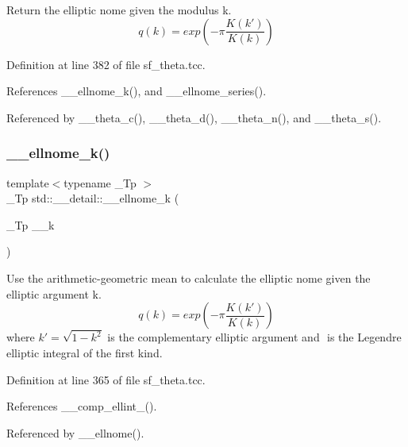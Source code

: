 Return the elliptic nome given the modulus {\ttfamily k}. \[ q(k) = exp\left(-\pi\frac{K(k')}{K(k)}\right) \] 

Definition at line 382 of file sf\+\_\+theta.\+tcc.



References \+\_\+\+\_\+ellnome\+\_\+k(), and \+\_\+\+\_\+ellnome\+\_\+series().



Referenced by \+\_\+\+\_\+theta\+\_\+c(), \+\_\+\+\_\+theta\+\_\+d(), \+\_\+\+\_\+theta\+\_\+n(), and \+\_\+\+\_\+theta\+\_\+s().

\mbox{\label{namespacestd_1_1____detail_a7631f367a1be34f98cec2021d588457b}} 
\subsubsection{\texorpdfstring{\+\_\+\+\_\+ellnome\+\_\+k()}{\_\_ellnome\_k()}}
{\footnotesize\ttfamily template$<$typename \+\_\+\+Tp $>$ \\
\+\_\+\+Tp std\+::\+\_\+\+\_\+detail\+::\+\_\+\+\_\+ellnome\+\_\+k (\begin{DoxyParamCaption}\item[{\+\_\+\+Tp}]{\+\_\+\+\_\+k }\end{DoxyParamCaption})}

Use the arithmetic-\/geometric mean to calculate the elliptic nome given the elliptic argument k. \[ q(k) = exp\left(-\pi\frac{K(k')}{K(k)}\right) \] where $ k' = \sqrt{1 - k^2} $ is the complementary elliptic argument and $ $ is the Legendre elliptic integral of the first kind. 

Definition at line 365 of file sf\+\_\+theta.\+tcc.



References \+\_\+\+\_\+comp\+\_\+ellint\+\_().



Referenced by \+\_\+\+\_\+ellnome().

\mbox{\label{namespacestd_1_1____detail_aec07b9131f90495831d349d22768425f}} 
